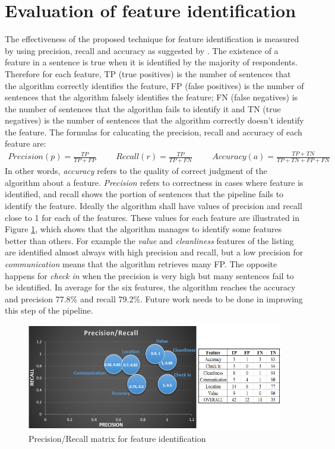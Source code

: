 \section{Evaluation of feature identification}
The effectiveness of the proposed technique for feature identification is measured by using precision, recall and accuracy as suggested by \cite{huang2006performance}.
The existence of a feature in a sentence is true when it is identified by the majority of respondents. Therefore for each  feature, TP (true positives) is the number of sentences that the algorithm correctly identifies the feature, FP (false positives) is the number of sentences that the algorithm falsely identifies the feature; FN (false negatives) is the number of sentences that the algorithm fails to identify it and TN (true negatives) is the number of sentences that the algorithm correctly doesn't identify the feature. The formulas for calucating the precision, recall and accuracy of each feature are:
\begin{align}
Precision  (p) =\frac{TP}{TP+FP} \hspace{1cm}
Recall  (r) = \frac{TP}{TP + FN} \hspace{1cm}
Accuracy (a) = \frac{TP + TN}{TP+TN+FP+FN}
\end{align}
In other words, \textit{accuracy} refers to the quality of correct judgment of the algorithm about a feature.  \textit{Precision} refers to correctness in cases where feature is identified, and recall shows the portion of sentences that the pipeline fails to identify the feature. Ideally the algorithm shall have values of precision and recall close to 1 for each of the features.
These values for each feature are illustrated in Figure \ref{fig:matrix}, which shows that the algorithm manages to identify some features better than others. For example the \textit{value} and \textit{cleanliness} features of the listing are identified almost always with high precision and recall, but a low precision for \textit{communication} means that the algorithm retrieves many FP. The opposite happens for \textit{check in} when the precision is very high but many sentences fail to be identified. In average for the six features, the algorithm reaches the accuracy and precision 77.8\% and recall 79.2\%. Future work needs to be done in improving this step of the pipeline.
\begin{figure}[h!]
	\centering
	\includegraphics[height=0.3\textheight]{PR_table}
	\caption{Precision/Recall matrix for feature identification}
	\label{fig:matrix}
\end{figure}